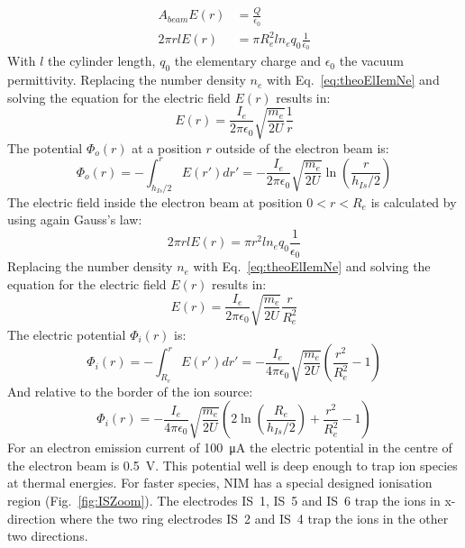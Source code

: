 	\begin{align}
		A_{beam} E(r) &= \frac{Q}{\epsilon_0}\\
		2\pi r l E(r) &= \pi R_e^2 l n_e q_0 \frac{1}{\epsilon_0}
	\end{align}
	With $l$ the cylinder length, $q_0$ the elementary charge and $\epsilon_0$ the vacuum permittivity. Replacing the number density $n_e$ with Eq.~\eqref{eq:theoElIemNe} and solving the equation for the electric field $E(r)$ results in:
	\begin{equation}
		E(r) = \frac{I_e}{2 \pi \epsilon_0} \sqrt{\frac{m_e}{2U}}\frac{1}{r}
	\end{equation}
	The potential $\Phi_o (r)$ at a position $r$ outside of the electron beam is:
	\begin{equation}
		\Phi_o (r) = -\int_{h_{Is}/2}^{r} E(r') dr' = -\frac{I_e}{2\pi\epsilon_0}\sqrt{\frac{m_e}{2U}}\ln\left(\frac{r}{h_{Is}/2}\right)
	\end{equation}
	The electric field inside the electron beam at position $0<r<R_e$ is calculated by using again Gauss's law:
	\begin{equation}
		2\pi r l E(r) = \pi r^2 l n_e q_0 \frac{1}{\epsilon_0}
	\end{equation}
	Replacing the number density $n_e$ with Eq.~\eqref{eq:theoElIemNe} and solving the equation for the electric field $E(r)$ results in:
	\begin{equation}
		E(r) = \frac{I_e}{2\pi\epsilon_0}\sqrt{\frac{m_e}{2U}}\frac{r}{R_e^2}
	\end{equation}
	The electric potential $\Phi_i (r)$ is:
	\begin{equation}
		\Phi_i (r) = -\int_{R_e}^{r} E(r') dr' = -\frac{I_e}{4\pi\epsilon_0}\sqrt{\frac{m_e}{2U}}\left(\frac{r^2}{R_e^2} -1 \right)
	\end{equation}
	And relative to the border of the ion source:
	\begin{equation}
		\Phi_i (r) = -\frac{I_e}{4\pi\epsilon_0}\sqrt{\frac{m_e}{2U}}\left(2\ln\left(\frac{R_e}{h_{Is}/2}\right) +\frac{r^2}{R_e^2} -1 \right)
		\label{eq:elPotIem}
	\end{equation}
	For an electron emission current of 100~\si{\micro\ampere} the electric potential in the centre of the electron beam is 0.5~\si{\volt}. This potential well is deep enough to trap ion species at thermal energies. For faster species, NIM has a special designed ionisation region (Fig.~\ref{fig:ISZoom}). The electrodes IS~1, IS~5 and IS~6 trap the ions in x-direction where the two ring electrodes IS~2 and IS~4 trap the ions in the other two directions.		
